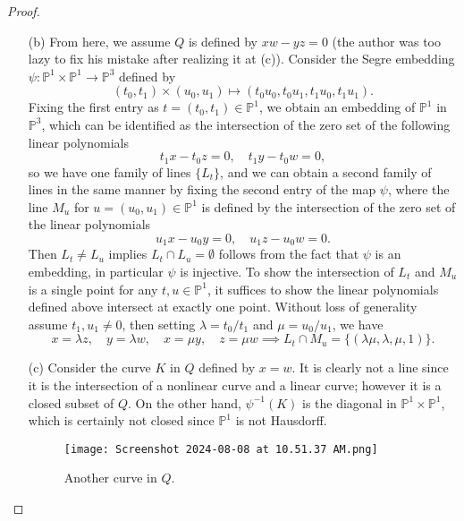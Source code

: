 \documentclass[12pt]{article}
\newcommand{\PP}{\mathbb{P}}
\theoremstyle{definition}
\begin{document}
\begin{enumerate} [label=\textbf{\arabic*.}, leftmargin=-0.05em]
\begin{proof}
\begin{itemize}
        \item[(b)] From here, we assume $Q$ is defined by $xw - yz = 0$ (the author was too lazy to fix his mistake after realizing it at (c)). Consider the Segre embedding $\psi : \PP^1 \times \PP^1 \to \PP^3$ defined by
        \begin{equation*}
            (t_0, t_1) \times (u_0, u_1) \mapsto (t_0 u_0, t_0 u_1, t_1 u_0, t_1 u_1).
        \end{equation*}
        Fixing the first entry as $t = (t_0, t_1) \in \PP^1$, we obtain an embedding of $\PP^1$ in $\PP^3$, which can be identified as the intersection of the zero set of the following linear polynomials
        \begin{equation*}
            t_1 x - t_0 z = 0, \quad t_1 y - t_0 w = 0,
        \end{equation*}
        so we have one family of lines $\{ L_t \}$, and we can obtain a second family of lines in the same manner by fixing the second entry of the map $\psi$, where the line $M_u$ for $u = (u_0, u_1) \in \PP^1$ is defined by the intersection of the zero set of the linear polynomials
        \begin{equation*}
            u_1 x - u_0 y = 0, \quad u_1 z - u_0 w = 0.
        \end{equation*}
        Then $L_t \neq L_u$ implies $L_t \cap L_u = \emptyset$ follows from the fact that $\psi$ is an embedding, in particular $\psi$ is injective. To show the intersection of $L_t$ and $M_u$ is a single point for any $t, u \in \PP^1$, it suffices to show the linear polynomials defined above intersect at exactly one point. Without loss of generality assume $t_1, u_1 \neq 0$, then setting $\lambda = t_0 / t_1$ and $\mu = u_0 / u_1$, we have
        \begin{equation*}
            x = \lambda z, \quad y = \lambda w, \quad x = \mu y, \quad z = \mu w \implies L_t \cap M_u = \{ (\lambda \mu, \lambda, \mu, 1) \}.
        \end{equation*}

        \item[(c)] Consider the curve $K$ in $Q$ defined by $x = w$. It is clearly not a line since it is the intersection of a nonlinear curve and a linear curve; however it is a closed subset of $Q$. On the other hand, $\psi^{-1}(K)$ is the diagonal in $\PP^1 \times \PP^1$, which is certainly not closed since $\PP^1$ is not Hausdorff.

        \begin{figure} [H]
            \centering
            \texttt{[image: Screenshot 2024-08-08 at 10.51.37 AM.png]}
            \caption{Another curve in $Q$.}
        \end{figure}
    \end{itemize} 
\end{proof}


\end{enumerate}
\end{document}
